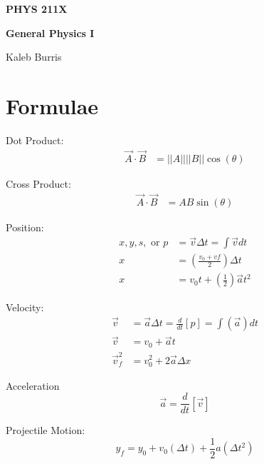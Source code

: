\documentclass[10pt, letterpaper]{book}
\begin{document}
    \begin{titlepage}
        \Huge \textbf{PHYS 211X}

        \huge \textbf{General Physics I}

        \vfill

        \Large Kaleb Burris
    \end{titlepage}

    \section*{Formulae}

    \begin{multicols*}{2}

        Dot Product:
        \begin{align}
            \vec{A}\cdot\vec{B} & = ||A|| ||B||\cos(\theta)
        \end{align}

        Cross Product:
        \begin{align}
            \vec{A}\cdot\vec{B} & = AB\sin(\theta)
        \end{align}

        Position:
        \begin{align}
            x, y, s, \text{ or } p  & = \vec{v}\Delta t = \int\vec{v}dt                     \\
                                 x  & = \left(\frac{v_{0}+v{f}}{2}\right)\Delta t           \\
                                 x  & = v_{0} t+\left(\frac{1}{2}\right)\vec{a} t^{2}       
        \end{align}

        Velocity:
        \begin{align}
            \vec{v}         & = \vec{a}\Delta t = \frac{d}{dt}[p] = \int(\vec{a})dt     \\
            \vec{v}         & = v_{0} + \vec{a}t                                        \\
            \vec{v}^{2}_{f} & = v^{2}_{0} + 2\vec{a}\Delta x                            
        \end{align}

        Acceleration
        \begin{equation}
            \vec{a} = \frac{d}{dt}[\vec{v}]
        \end{equation}

        Projectile Motion:
        \begin{equation}
            \label{eqn::yfinal}
            y_{f} = y_{0} + v_{0}(\Delta t) + \frac{1}{2}a(\Delta t^{2})
        \end{equation}


\end{multicols*}
\end{document}
